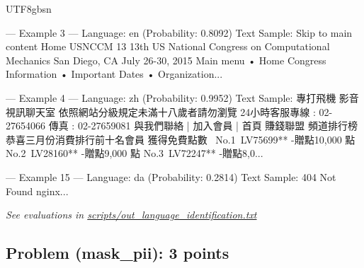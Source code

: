 \documentclass[letterpaper]{article}
\begin{document}
\begin{itemize}
\begin{CJK*}{UTF8}{gbsn}
	\begin{mdframed}
	--- Example 3 ---
Language: en (Probability: 0.8092)
Text Sample: Skip to main content Home USNCCM 13 13th US National Congress on Computational Mechanics San Diego, CA July 26-30, 2015  Main menu    • Home  Congress Information    • Important Dates   • Organization...

--- Example 4 ---
Language: zh (Probability: 0.9952)
Text Sample: 專打飛機 影音視訊聊天室 依照網站分級規定未滿十八歲者請勿瀏覽 24小時客服專線 : 02-27654066 傳真 : 02-27659081 與我們聯絡 | 加入會員 | 首頁 $賺錢聯盟$ 頻道排行榜 恭喜三月份消費排行前十名會員 獲得免費點數~ No.1 LV75699** -贈點10,000 點 No.2 LV28160** -贈點9,000 點 No.3 LV72247** -贈點8,0...

--- Example 15 ---
Language: da (Probability: 0.2814)
Text Sample: 404 Not Found  nginx...
	\end{mdframed}
\end{CJK*}

\textit{See evaluations in  \href{https://github.com/echung32/ece405-assignment2-data/blob/main/scripts/out_language_identification.txt}{scripts/out\_language\_identification.txt}}

\end{itemize}

\subsection{Problem (mask\_pii): 3 points}
\end{document}
